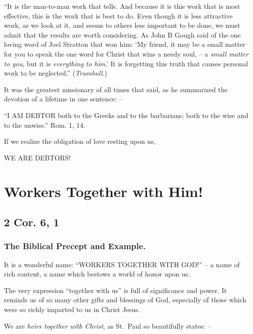 \documentclass[
]{book}
\begin{document}
``It is the man-to-man work that tells. And because it is this work that is most effective, this is the work that is best to do. Even though it is less attractive work, as we look at it, and seems to others less important to be done, we must admit that the results are worth considering. As John B Gough said of the one loving word of Joel Stratton that won him: `My friend, it may be a small matter for you to speak the one word for Christ that wins a needy soul, -- a \emph{small matter to you}, but it is \emph{everything to him}.' It is forgetting this truth that causes personal work to be neglected.'' (\emph{Trumbull}.)

It was the greatest missionary of all times that said, as he summarized the devotion of a lifetime in one sentence: --

``I AM DEBTOR both to the Greeks and to the barbarians; both to the wise and to the unwise.'' Rom. 1, 14.

If we realize the obligation of love resting upon us,

\begin{center} WE ARE DEBTORS! \end{center}

\hypertarget{workers-together-with-him}{%
\chapter{Workers Together with Him!}\label{workers-together-with-him}}

\hypertarget{cor.-6-1}{%
\section*{2 Cor. 6, 1}\label{cor.-6-1}}

\hypertarget{the-biblical-precept-and-example.}{%
\subsection*{The Biblical Precept and Example.}\label{the-biblical-precept-and-example.}}

It is a wonderful name: ``WORKERS TOGETHER WITH GOD!'' -- a name of rich content, a name which bestows a world of honor upon us.

The very expression ``together with us'' is full of significance and power. It reminds us of so many other gifts and blessings of God, especially of those which were so richly imparted to us in Christ Jesus.

We are \emph{heirs together with Christ}, as St.~Paul so beautifully states: --
\end{document}
